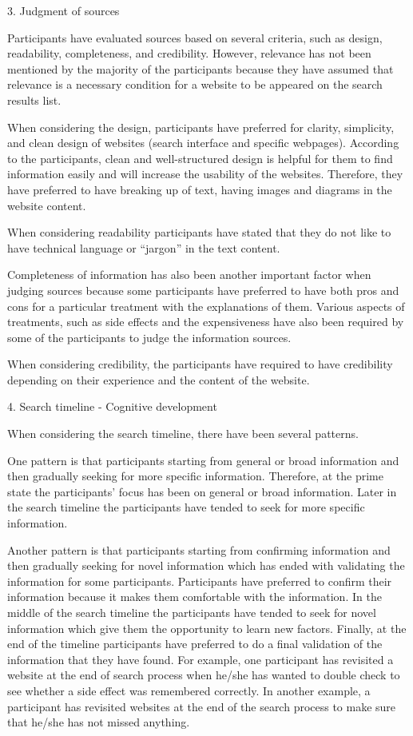 \documentclass[]{article}
\begin{document}
3. Judgment of sources

Participants have evaluated sources based on several criteria, such as design, readability, completeness, and credibility. However, relevance has not been mentioned by the majority of the participants because they have assumed that relevance is a necessary condition for a website to be appeared on the search results list. 

When considering the design, participants have preferred for clarity, simplicity, and clean design of websites (search interface and specific webpages). According to the participants, clean and well-structured design is helpful for them to find information easily and will increase the usability of the websites. Therefore, they have preferred to have breaking up of text, having images and diagrams in the website content. 

When considering readability participants have stated that they do not like to have technical language or “jargon” in the text content. 
 
Completeness of information has also been another important factor when judging sources because some participants have preferred to have both pros and cons for a particular treatment with the explanations of them.  
Various aspects of treatments, such as side effects and the expensiveness have also been required by some of the participants to judge the information sources.
  
When considering credibility, the participants have required to have credibility depending on their experience and the content of the website. 

4. Search timeline - Cognitive development

When considering the search timeline, there have been several patterns. 

One pattern is that participants starting from general or broad information and then gradually seeking for more specific information. Therefore, at the prime state the participants’ focus has been on general or broad information. Later in the search timeline the participants have tended to seek for more specific information. 

Another pattern is that participants starting from confirming information and then gradually seeking for novel information which has ended with validating the information for some participants. Participants have preferred to confirm their information because it makes them comfortable with the information. In the middle of the search timeline the participants have tended to seek for novel information which give them the opportunity to learn new factors. Finally, at the end of the timeline participants have preferred to do a final validation of the information that they have found. For example, one participant has revisited a website at the end of search process when he/she has wanted to double check to see whether a side effect was remembered correctly. In another example, a participant has revisited websites at the end of the search process to make sure that he/she has not missed anything.      
\end{document}
